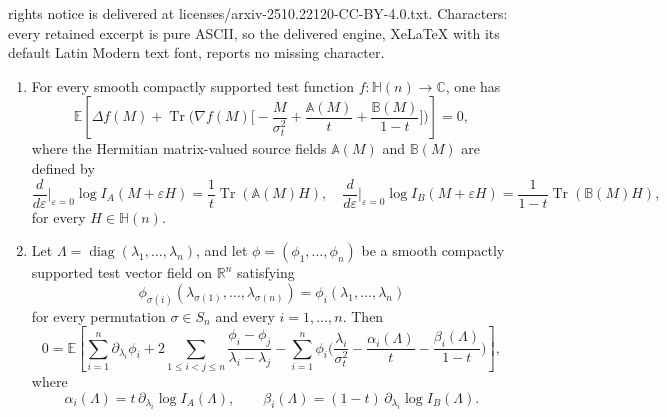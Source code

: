 \documentclass[10pt,a4paper]{amsart}
\DeclareMathOperator{\Tr}{Tr}
\DeclareMathOperator{\diag}{diag}
\newcommand{\C}{\mathbb{C}}
\newcommand{\EE}{\mathbb{E}}
\newcommand{\HH}{\mathbb{H}(n)}
\newcommand{\R}{\mathbb{R}}
\begin{document}
rights notice is delivered at licenses/arxiv-2510.22120-CC-BY-4.0.txt. Characters: every retained excerpt is pure ASCII, so the delivered engine, XeLaTeX with its default Latin Modern text font, reports no missing character.
\begin{proposition}
\label{prop:master_SD}
\leavevmode
\begin{enumerate}
\item[\textup{(i)}] For every smooth compactly supported test function
$f:\HH\to\C$, one has
\begin{equation}\label{eq:master_SD_physical}
\EE\!\left[
\Delta f(M)
+
\Tr\!\Big(
\nabla f(M)
\Big[
-\frac{M}{\sigma_t^2}
+\frac{\mathbb A(M)}{t}
+\frac{\mathbb B(M)}{1-t}
\Big]
\Big)
\right]
=0,
\end{equation}
where the Hermitian matrix-valued source fields $\mathbb A(M)$ and
$\mathbb B(M)$ are defined by
\begin{equation}\label{eq:source_fields_defs_SD}
\frac{d}{d\varepsilon}\Big|_{\varepsilon=0}\log I_A(M+\varepsilon H)
=
\frac1t\Tr(\mathbb A(M)H),
\quad
\frac{d}{d\varepsilon}\Big|_{\varepsilon=0}\log I_B(M+\varepsilon H)
=
\frac1{1-t}\Tr(\mathbb B(M)H),
\end{equation}
for every $H\in\HH$.

\item[\textup{(ii)}] Let $\Lambda=\diag(\lambda_1,\dots,\lambda_n)$, and let
$\phi=(\phi_1,\dots,\phi_n)$ be a smooth compactly supported test vector field on
$\R^n$ satisfying
\begin{equation}
\phi_{\sigma(i)}(\lambda_{\sigma(1)},\dots,\lambda_{\sigma(n)})
=
\phi_i(\lambda_1,\dots,\lambda_n)
\end{equation}
for every permutation $\sigma\in S_n$ and every $i=1,\dots,n$. Then
\begin{equation}\label{eq:eigenvalue_SD_physical}
0=
\EE\!\left[
\sum_{i=1}^n \partial_{\lambda_i}\phi_i
+
2\sum_{1\le i<j\le n}\frac{\phi_i-\phi_j}{\lambda_i-\lambda_j}
-
\sum_{i=1}^n
\phi_i
\Big(
\frac{\lambda_i}{\sigma_t^2}
-\frac{\alpha_i(\Lambda)}{t}
-\frac{\beta_i(\Lambda)}{1-t}
\Big)
\right],
\end{equation}
where
\begin{equation} 
\alpha_i(\Lambda)=t\,\partial_{\lambda_i}\log I_A(\Lambda),
\qquad
\beta_i(\Lambda)=(1-t)\,\partial_{\lambda_i}\log I_B(\Lambda).
\end{equation}
\end{enumerate}
\end{proposition}
\end{document}
